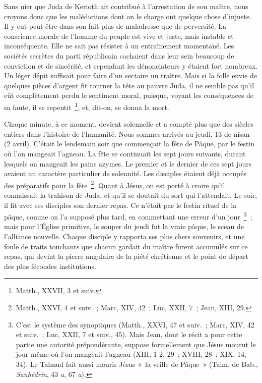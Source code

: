 \documentclass[french,twoside]{book} %
\begin{document}
Sans nier que Juda de Kerioth ait contribué à l’arrestation de son maître, nous croyons donc que les malédictions dont on le charge ont quelque chose d’injuste. Il y eut peut-être dans son fait plus de maladresse que de perversité. La conscience morale de l’homme du peuple est vive et juste, mais instable et inconséquente. Elle ne sait pas résister à un entraînement momentané. Les sociétés secrètes du parti républicain cachaient dans leur sein beaucoup de conviction et de sincérité, et cependant les dénonciateurs y étaient fort nombreux. Un léger dépit suffisait pour faire d’un sectaire un traître. Mais si la folle envie de quelques pièces d’argent fit tourner la tête au pauvre Juda, il ne semble pas qu’il eût complètement perdu le sentiment moral, puisque, voyant les conséquences de sa faute, il se repentit \footnote{Matth., XXVII, 3 et suiv.}, et, dit-on, se donna la mort.\par
Chaque minute, à ce moment, devient solennelle et a compté plus que des siècles entiers dans l’histoire de l’humanité. Nous sommes arrivés au jeudi, 13 de nisan (2 avril). C’était le lendemain soir que commençait la fête de Pâque, par le festin où l’on mangeait l’agneau. La fête se continuait les sept jours suivants, durant lesquels on mangeait les pains azymes. Le premier et le dernier de ces sept jours avaient un caractère particulier de solennité. Les disciples étaient déjà occupés des préparatifs pour la fête \footnote{Matth., XXVI, 4 et suiv. ; Marc, XIV, 42 ; Luc, XXII, 7 ; Jean, XIII, 29.}. Quant à Jésus, on est porté à croire qu’il connaissait la trahison de Juda, et qu’il se doutait du sort qui l’attendait. Le soir, il fit avec ses disciples son dernier repas. Ce n’était pas le festin rituel de la pâque, comme on l’a supposé plus tard, en commettant une erreur d’un jour \footnote{ C’est le système des synoptiques (Matth., XXVI, 47 et suiv. ; Marc, XIV, 42 et suiv. ; Luc, XXII, 7 et suiv., 45). Mais Jean, dont le récit a pour cette partie une autorité prépondérante, suppose formellement que Jésus mourut le jour même où l’on mangeait l’agneau (XIII, 1-2, 29 ; XVIII, 28 ; XIX, 14, 34). Le Talmud fait aussi mourir Jésus « la veille de Pâque » (Talm. de Bab., {\itshape Sanhédrin}, 43 {\itshape a}, 67 {\itshape a}).} ; mais pour l’Église primitive, le souper du jeudi fut la vraie pâque, le sceau de l’alliance nouvelle. Chaque disciple y rapporta ses plus chers souvenirs, et une foule de traits touchants que chacun gardait du maître furent accumulés sur ce repas, qui devint la pierre angulaire de la piété chrétienne et le point de départ des plus fécondes institutions.\par
\end{document}
